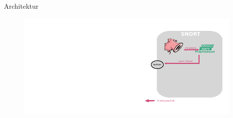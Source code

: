 \begin{frame}{Architektur}
    \begin{figure}
    	\centering
    	\includegraphics[width=\textwidth]{./images/arch/3.pdf}
    \end{figure}
\end{frame}
